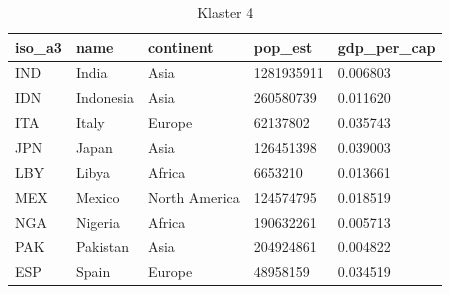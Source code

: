 \documentclass[11pt]{report}
\begin{document}
    \begin{table}[h!]
        \caption {Klaster 4} \label{tab:cl4}
        \begin{tabular}{lllll}
            \hline
            \multicolumn{1}{|l|}{iso\_a3} & \multicolumn{1}{l|}{name} & \multicolumn{1}{l|}{continent} & \multicolumn{1}{l|}{pop\_est} & \multicolumn{1}{l|}{gdp\_per\_cap} \\ \hline
            IND                           & India                     & Asia                           & 1281935911                    & 0.006803                           \\
            IDN                           & Indonesia                 & Asia                           & 260580739                     & 0.011620                           \\
            ITA                           & Italy                     & Europe                         & 62137802                      & 0.035743                           \\
            JPN                           & Japan                     & Asia                           & 126451398                     & 0.039003                           \\
            LBY                           & Libya                     & Africa                         & 6653210                       & 0.013661                           \\
            MEX                           & Mexico                    & North America                  & 124574795                     & 0.018519                           \\
            NGA                           & Nigeria                   & Africa                         & 190632261                     & 0.005713                           \\
            PAK                           & Pakistan                  & Asia                           & 204924861                     & 0.004822                           \\
            ESP                           & Spain                     & Europe                         & 48958159                      & 0.034519

        \end{tabular}
    \end{table}
\end{document}
